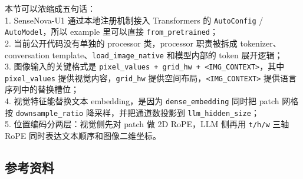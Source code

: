 \begin{summarybox}
本节可以浓缩成五句话：\\
1. SenseNova-U1 通过本地注册机制接入 Transformers 的 \texttt{AutoConfig} / \texttt{AutoModel}，所以 example 里可以直接 \texttt{from\_pretrained}；\\
2. 当前公开代码没有单独的 processor 类，processor 职责被拆成 tokenizer、conversation template、\texttt{load\_image\_native} 和模型内部的 token 展开逻辑；\\
3. 图像输入的关键格式是 \texttt{pixel\_values + grid\_hw + <IMG\_CONTEXT>}，其中 \texttt{pixel\_values} 提供视觉内容，\texttt{grid\_hw} 提供空间布局，\texttt{<IMG\_CONTEXT>} 提供语言序列中的替换槽位；\\
4. 视觉特征能替换文本 embedding，是因为 \texttt{dense\_embedding} 同时把 patch 网格按 \texttt{downsample\_ratio} 降采样，并把通道数投影到 \texttt{llm\_hidden\_size}；\\
5. 位置编码分两层：视觉侧先对 patch 做 2D RoPE，LLM 侧再用 \texttt{t/h/w} 三轴 RoPE 同时表达文本顺序和图像二维坐标。
\end{summarybox}

\subsection{参考资料}

